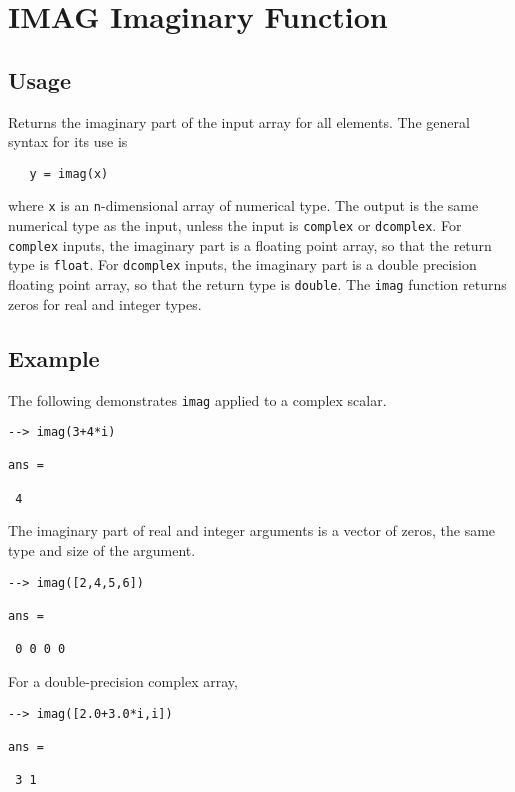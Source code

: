 \section{IMAG Imaginary Function}

\subsection{Usage}

Returns the imaginary part of the input array for all elements.  The 
general syntax for its use is
\begin{verbatim}
   y = imag(x)
\end{verbatim}
where \verb|x| is an \verb|n|-dimensional array of numerical type.  The output 
is the same numerical type as the input, unless the input is \verb|complex|
or \verb|dcomplex|.  For \verb|complex| inputs, the imaginary part is a floating
point array, so that the return type is \verb|float|.  For \verb|dcomplex|
inputs, the imaginary part is a double precision floating point array, so that
the return type is \verb|double|.  The \verb|imag| function returns zeros for 
real and integer types.
\subsection{Example}

The following demonstrates \verb|imag| applied to a complex scalar.
\begin{verbatim}
--> imag(3+4*i)

ans = 

 4 
\end{verbatim}
The imaginary part of real and integer arguments is a vector of zeros, the
same type and size of the argument.
\begin{verbatim}
--> imag([2,4,5,6])

ans = 

 0 0 0 0 
\end{verbatim}
For a double-precision complex array,
\begin{verbatim}
--> imag([2.0+3.0*i,i])

ans = 

 3 1 
\end{verbatim}
